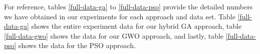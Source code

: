 For reference, tables \ref{full-data-ga} to \ref{full-data-pso} provide the detailed numbers we have obtained in our experiments for each approach and data set. Table \ref{full-data-ga} shows the entire experiment data for our hybrid GA approach, table \ref{full-data-gwo} shows the data for our GWO approach, and lastly, table \ref{full-data-pso} shows the data for the PSO approach.

\begin{table}
\centering
\begin{adjustwidth}{}{}
\end{adjustwidth}
\end{table}
